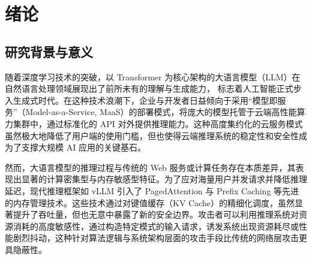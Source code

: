 \documentclass[master, vlined]{DissertUESTC}
\begin{document}
	

	\chapter{绪论}
	\section{研究背景与意义}


	
	随着深度学习技术的突破，以 Transformer 为核心架构的大语言模型（LLM）在自然语言处理领域展现出了前所未有的理解与生成能力，	标志着人工智能正式步入生成式时代。在这种技术浪潮下，企业与开发者日益倾向于采用“模型即服务”（Model-as-a-Service, MaaS）的部署模式，将庞大的模型托管于云端高性能算力集群中，通过标准化的 API 对外提供推理能力。这种高度集约化的云服务模式虽然极大地降低了用户端的使用门槛，但也使得云端推理系统的稳定性和安全性成为了支撑大规模 AI 应用的关键基石。

	然而，大语言模型的推理过程与传统的 Web 服务或计算任务存在本质差异，其表现出显著的计算密集型与内存敏感型特征。为了应对海量用户并发请求并降低推理延迟，现代推理框架如 vLLM 引入了 PagedAttention 与 Prefix Caching 等先进的内存管理技术。这些技术通过对键值缓存（KV Cache）的精细化调度，虽然显著提升了吞吐量，但也无意中暴露了新的安全边界。攻击者可以利用推理系统对资源消耗的高度敏感性，通过构造特定模式的输入请求，诱发系统出现资源耗尽或性能剧烈抖动，这种针对算法逻辑与系统架构层面的攻击手段比传统的网络层攻击更具隐蔽性。
\end{document}

